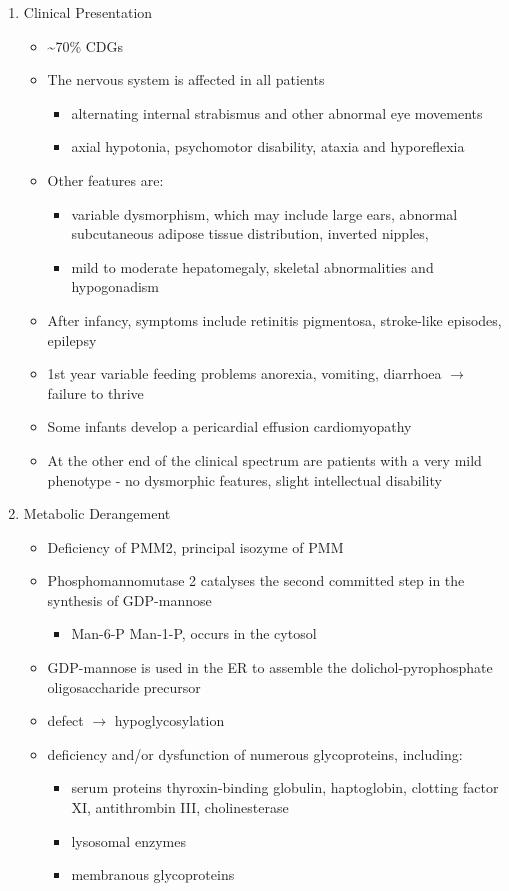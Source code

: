 \documentclass{scrartcl}
\begin{document}
\begin{enumerate}
\item Clinical Presentation
\label{sec:org5a0794f}
\begin{itemize}
\item \textasciitilde{}70\% CDGs
\item The nervous system is affected in all patients
\begin{itemize}
\item alternating internal strabismus and other abnormal eye movements
\item axial hypotonia, psychomotor disability, ataxia and hyporeflexia
\end{itemize}
\item Other features are:
\begin{itemize}
\item variable dysmorphism, which may include large ears, abnormal
subcutaneous adipose tissue distribution, inverted nipples,
\item mild to moderate hepatomegaly, skeletal abnormalities and hypogonadism
\end{itemize}
\item After infancy, symptoms include retinitis pigmentosa, stroke-like episodes, \textpm{} epilepsy
\item 1st year variable feeding problems anorexia, vomiting, diarrhoea \(\to\) failure to thrive
\item Some infants develop a pericardial effusion \textpm{} cardiomyopathy
\item At the other end of the clinical spectrum are patients with a very
mild phenotype - no dysmorphic features, slight intellectual disability
\end{itemize}

\item Metabolic Derangement
\label{sec:orgc7e7f79}
\begin{itemize}
\item Deficiency of PMM2, principal isozyme of PMM
\item Phosphomannomutase 2 catalyses the second committed step in the synthesis of GDP-mannose
\begin{itemize}
\item Man-6-P \ce{<=>} Man-1-P, occurs in the cytosol
\end{itemize}
\item GDP-mannose is used in the ER to assemble the dolichol-pyrophosphate
oligosaccharide precursor
\item defect \(\to\) hypoglycosylation
\item deficiency and/or dysfunction of numerous glycoproteins, including:
\begin{itemize}
\item serum proteins thyroxin-binding globulin, haptoglobin, clotting
factor XI, antithrombin III, cholinesterase
\item lysosomal enzymes
\item membranous glycoproteins
\end{itemize}
\end{itemize}


\end{enumerate}
\end{document}
